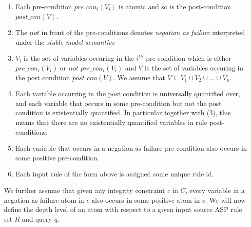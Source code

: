 \begin{enumerate}
    \item Each pre-condition $pre\_con_{i}(V_{i})$ is atomic and so is the post-condition $post\_con(V)$.
    \item The $not$ in front of the pre-conditions denotes \textit{negation as failure} interpreted under the \textit{stable model semantics}
    \item $V_{i}$ is the set of variables occuring in the $i^{th}$ pre-condition which is either $pre\_con_{i}(V_{i})$ or $not$ $pre\_con_{i}(V_{i})$ and $V$ is the set of variables occuring in the post condition $post\_con(V)$. We assume that $V\subseteq V_{1}\cup V_{2}\cup ... \cup V_{n}$.
    \item Each variable occurring in the post condition is universally quantified over, and each variable that occurs in some pre-condition but not the post condition is existentially quantified. In particular together with (3), this means that there are no existentially quantified variables in rule post-conditions.
    \item Each variable that occurs in a negation-as-failure pre-condition also occurs in some positive pre-condition.
    \item Each input rule of the form above is assigned some unique rule id.
\end{enumerate}

We further assume that given any integrity constraint $c$ in $C$, every variable in a negation-as-failure atom in $c$ also occurs in some positive atom in $c$. We will now define the depth level of an atom with respect to a given input source ASP rule set $R$ and query $q$.

